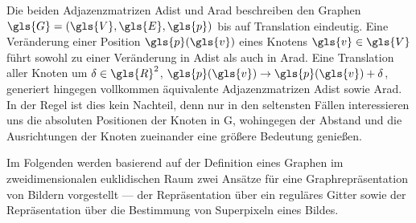 Die beiden Adjazenzmatrizen \gls{Adist} und \gls{Arad} beschreiben den Graphen $\gls{G} = \left(\gls{V}, \gls{E}, \gls{p}\right)$ bis auf Translation eindeutig.
Eine Veränderung einer Position $\gls{p}\left(\gls{v}\right)$ eines Knotens $\gls{v} \in \gls{V}$ führt sowohl zu einer Veränderung in \gls{Adist} als auch in \gls{Arad}.
Eine Translation aller Knoten um $\ve{\delta} \in \gls{R}^2$, \dhe{} $\gls{p}\left(\gls{v}\right) \rightarrow \gls{p}\left(\gls{v}\right) + \ve{\delta}$, generiert hingegen vollkommen äquivalente Adjazenzmatrizen \gls{Adist} sowie \gls{Arad}.
In der Regel ist dies kein Nachteil, denn nur in den seltensten Fällen interessieren uns die absoluten Positionen der Knoten in \gls{G}, wohingegen der Abstand und die Ausrichtungen der Knoten zueinander eine größere Bedeutung genießen.

Im Folgenden werden basierend auf der Definition eines Graphen im zweidimensionalen  euklidischen Raum zwei Ansätze für eine Graphrepräsentation von Bildern vorgestellt — der Repräsentation über ein reguläres Gitter sowie der Repräsentation über die Bestimmung von Superpixeln eines Bildes.



